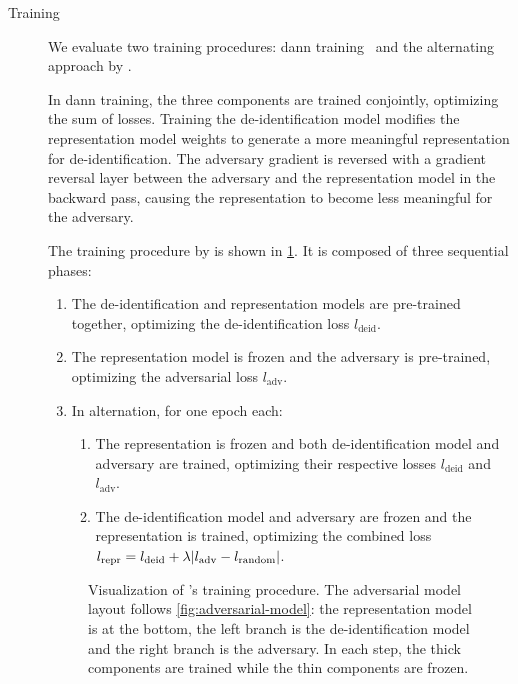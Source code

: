 \begin{description}
    \item[Training]
    We evaluate two training procedures: \ac{dann} training~\citep{ganin2016domain} and the alternating approach by \citet{feutry2018learning}.
    
    In \ac{dann} training, the three components are trained conjointly, optimizing the sum of losses.
    Training the de-identification model modifies the representation model weights to generate a more meaningful representation for de-identification.
    The adversary gradient is reversed with a gradient reversal layer between the adversary and the representation model in the backward pass, causing the representation to become less meaningful for the adversary.
    
    The training procedure by \citet{feutry2018learning} is shown in \cref{fig:feutry-training}.
    It is composed of three sequential phases:
    \begin{enumerate}
        \item The de-identification and representation models are pre-trained together, optimizing the de-identification loss $l_{\text{deid}}$.
        \item The representation model is frozen and the adversary is pre-trained, optimizing the adversarial loss $l_{\text{adv}}$.
        \item In alternation, for one epoch each:
        \begin{enumerate}
            \item The representation is frozen and both de-identification model and adversary are trained, optimizing their respective losses $l_{\text{deid}}$ and $l_{\text{adv}}$.
            \item The de-identification model and adversary are frozen and the representation is trained, optimizing the combined loss $l_{\text{repr}} = l_{\text{deid}} + \lambda \lvert l_{\text{adv}} - l_{\text{random}}\rvert$. \label{item:repr-training}
        \end{enumerate}
    \end{enumerate}
    
    \begin{figure}
        \centering
        
        \caption[Adversarial training procedure]{%
            Visualization of \citeauthor{feutry2018learning}'s training procedure.
            The adversarial model layout follows \cref{fig:adversarial-model}: the representation model is at the bottom, the left branch is the de-identification model and the right branch is the adversary.
            In each step, the thick components are trained while the thin components are frozen.
        }\label{fig:feutry-training}
    \end{figure}
    

\end{description}
